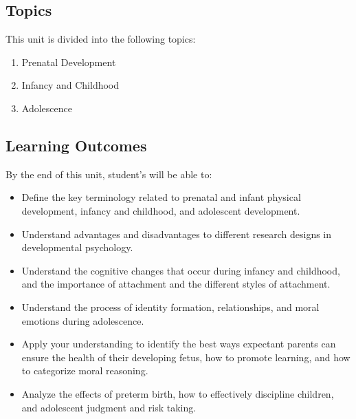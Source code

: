 \documentclass[
]{book}
\providecommand{\tightlist}{%
  \setlength{\itemsep}{0pt}\setlength{\parskip}{0pt}}
\begin{document}
\hypertarget{topics}{%
\subsection*{Topics}\label{topics}}

This unit is divided into the following topics:

\begin{enumerate}
\def\labelenumi{\arabic{enumi}.}
\tightlist
\item
  Prenatal Development\\
\item
  Infancy and Childhood\\
\item
  Adolescence
\end{enumerate}

\hypertarget{learning-outcomes}{%
\subsection*{Learning Outcomes}\label{learning-outcomes}}

By the end of this unit, student's will be able to:

\begin{itemize}
\tightlist
\item
  Define the key terminology related to prenatal and infant physical development, infancy and childhood, and adolescent development.\\
\item
  Understand advantages and disadvantages to different research designs in developmental psychology.\\
\item
  Understand the cognitive changes that occur during infancy and childhood, and the importance of attachment and the different styles of attachment.\\
\item
  Understand the process of identity formation, relationships, and moral emotions during adolescence.\\
\item
  Apply your understanding to identify the best ways expectant parents can ensure the health of their developing fetus, how to promote learning, and how to categorize moral reasoning.\\
\item
  Analyze the effects of preterm birth, how to effectively discipline children, and adolescent judgment and risk taking.
\end{itemize}
\end{document}
